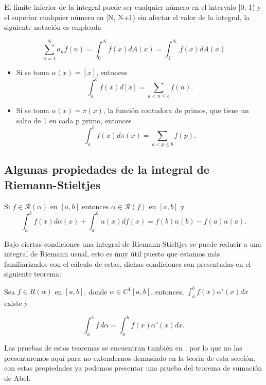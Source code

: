 \begin{note}
El límite inferior de la integral puede ser cualquier número en el intervalo [0, 1) y el superior cualquier número en [N, N+1) sin afectar el valor de la integral, la siguiente notación es empleada

$$\sum_{n=1}^N a_n f(n)=\int_0^N f(x) d A(x)=\int_{1^{-}}^N f(x) d A(x)$$
\end{note}

\begin{eg}
\phantom{uwu}
\begin{itemize}
\item Si se toma $\alpha(x)=[x]$, entonces
$$
\int_a^b f(x) d[x]=\sum_{a<n \leq b} f(n).
$$

\item Si se toma $\alpha(x)=\pi(x)$, la función contadora de primos, que tiene un salto de 1 en cada p primo, entonces
$$
\int_a^b f(x) d \pi(x)=\sum_{a<p \leq b} f(p).
$$
\end{itemize}
\end{eg}

\subsection{Algunas propiedades de la integral de Riemann-Stieltjes}


\begin{theorem}\label{integrac partes}
    Si $f\in \mathcal{R}(\alpha)$ en $[a,b]$ entonces $\alpha \in\mathcal{R}(f)$ en $[a,b]$ y $$\int_{a}^{b}f(x)d\alpha(x)+\int_{a}^{b}\alpha(x)df(x)=f(b)\alpha(b)-f(a)\alpha(a).$$
\end{theorem}

Bajo ciertas condiciones una integral de Riemann-Stieltjes se puede reducir a una integral de Riemann usual, esto es muy útil puesto que estamos más familiarizados con el cálculo de estas, dichas condiciones son presentadas en el siguiente teorema:

\begin{theorem}\label{reduccion a riemann}
    Sea $ f \in R(\alpha) $ en $[a, b]$, donde $ \alpha \in C^1[a, b]$, entonces,
$ \displaystyle\int_{a}^{b} f(x)\alpha'(x)dx$
existe y

\[ \int_{a}^{b} f \,d\alpha = \int_{a}^{b} f(x)\alpha'(x)dx. \]
\end{theorem}

Las pruebas de estos teoremas se encuentran también en \cite{Apostol:105425}, por lo que no las presentaremos aquí para no extendernos demasiado en la teoría de esta sección, con estas propiedades ya podemos presentar una prueba  del teorema de  sumación de Abel.

